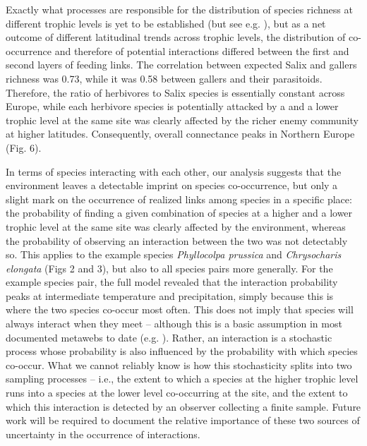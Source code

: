 \documentclass[12pt]{article}
\begin{document}
Exactly what processes are responsible for the distribution of species
richness at different trophic levels is yet to be established (but see e.g.
\citealt{Roininen2005, Nyman2010, Leppanen2014}), but as a net outcome of
different latitudinal trends across trophic levels, the distribution of co-
occurrence and therefore of potential interactions differed between the first
and second layers of feeding links. The correlation between expected Salix and
gallers richness was 0.73, while it was 0.58 between gallers and their
parasitoids. Therefore, the ratio of herbivores to Salix species is
essentially constant across Europe, while each herbivore species is
potentially attacked by a and a lower trophic level at the same site was
clearly affected by the richer enemy community at higher latitudes.
Consequently, overall connectance peaks in Northern Europe (Fig. 6).

In terms of species interacting with each other, our analysis suggests that
the environment leaves a detectable imprint on species co-occurrence, but only
a slight mark on the occurrence of realized links among species in a specific
place: the probability of finding a given combination of species at a higher
and a lower trophic level at the same site was clearly affected by the
environment, whereas the probability of observing an interaction between the
two was not detectably so. This applies to the example species
\textit{Phyllocolpa prussica} and \textit{Chrysocharis elongata} (Figs 2 and
3), but also to all species pairs more generally. For the example species
pair, the full model revealed that the interaction probability peaks at
intermediate temperature and precipitation, simply because this is where the
two species co-occur most often. This does not imply that species will always
interact when they meet – although this is a basic assumption in most
documented metawebs to date (e.g. \citealt{Havens1992, Wood2015}). Rather, an
interaction is a stochastic process whose probability is also influenced by
the probability with which species co-occur. What we cannot reliably know is
how this stochasticity splits into two sampling processes – i.e., the extent
to which a species at the higher trophic level runs into a species at the
lower level co-occurring at the site, and the extent to which this interaction
is detected by an observer collecting a finite sample. Future work will be
required to document the relative importance of these two sources of
uncertainty in the occurrence of interactions.

\end{document}
